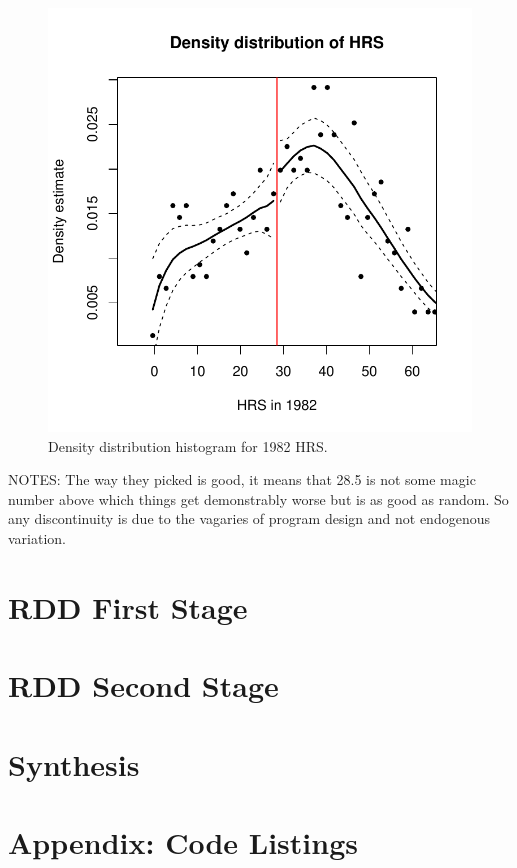 \documentclass[letterpaper, 12pt]{article}
\begin{document}
\begin{figure}[htbp]
\begin{center}
\includegraphics{ddplot.pdf}
\caption{Density distribution histogram for 1982 HRS.}
\label{fig:ddplot}
\end{center}
\end{figure}

NOTES: The way they picked is good, it means that 28.5 is not some magic number above which things get demonstrably worse but is as good as random.  So any discontinuity is due to the vagaries of program design and not endogenous variation.

\section{RDD First Stage}


\section{RDD Second Stage}

\section{Synthesis}

\section{Appendix: Code Listings}


\end{document}
